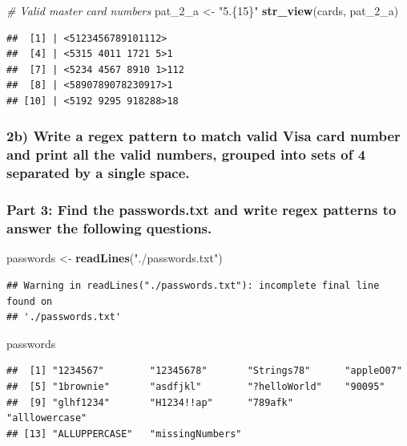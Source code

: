 \documentclass[
]{article}
\newenvironment{Shaded}{\begin{snugshade}}{\end{snugshade}}
\newcommand{\CommentTok}[1]{\textcolor[rgb]{0.56,0.35,0.01}{\textit{#1}}}
\newcommand{\FunctionTok}[1]{\textcolor[rgb]{0.13,0.29,0.53}{\textbf{#1}}}
\newcommand{\NormalTok}[1]{#1}
\newcommand{\OtherTok}[1]{\textcolor[rgb]{0.56,0.35,0.01}{#1}}
\newcommand{\StringTok}[1]{\textcolor[rgb]{0.31,0.60,0.02}{#1}}
\begin{document}
\begin{Shaded}
\begin{Highlighting}[]
\CommentTok{\# Valid master card numbers }
\NormalTok{pat\_2\_a }\OtherTok{\textless{}{-}} \StringTok{"5.\{15\}"}
\FunctionTok{str\_view}\NormalTok{(cards, pat\_2\_a)}
\end{Highlighting}
\end{Shaded}

\begin{verbatim}
##  [1] | <5123456789101112>
##  [4] | <5315 4011 1721 5>1
##  [7] | <5234 4567 8910 1>112
##  [8] | <5890789078230917>1
## [10] | <5192 9295 918288>18
\end{verbatim}

\subsubsection{2b) Write a regex pattern to match valid Visa card number
and print all the valid numbers, grouped into sets of 4 separated by a
single
space.}\label{b-write-a-regex-pattern-to-match-valid-visa-card-number-and-print-all-the-valid-numbers-grouped-into-sets-of-4-separated-by-a-single-space.}

\subsubsection{Part 3: Find the passwords.txt and write regex patterns
to answer the following
questions.}\label{part-3-find-the-passwords.txt-and-write-regex-patterns-to-answer-the-following-questions.}

\begin{Shaded}
\begin{Highlighting}[]
\NormalTok{passwords }\OtherTok{\textless{}{-}} \FunctionTok{readLines}\NormalTok{(}\StringTok{"./passwords.txt"}\NormalTok{)}
\end{Highlighting}
\end{Shaded}

\begin{verbatim}
## Warning in readLines("./passwords.txt"): incomplete final line found on
## './passwords.txt'
\end{verbatim}

\begin{Shaded}
\begin{Highlighting}[]
\NormalTok{passwords}
\end{Highlighting}
\end{Shaded}

\begin{verbatim}
##  [1] "1234567"        "12345678"       "Strings78"      "appleO07"      
##  [5] "1brownie"       "asdfjkl"        "?helloWorld"    "90095"         
##  [9] "glhf1234"       "H1234!!ap"      "789afk"         "alllowercase"  
## [13] "ALLUPPERCASE"   "missingNumbers"
\end{verbatim}
\end{document}
